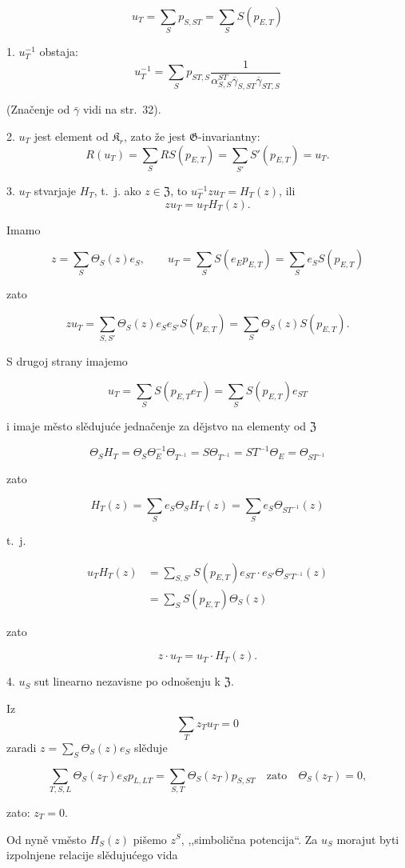 \documentclass[11pt]{article}
\begin{document}
\[
u_T=\sum_S p_{S,ST}=\sum_S S(p_{E,T})
\]



1. \(u_T^{-1}\) obstaja:
\[
u_T^{-1}=\sum_S p_{ST,S}
\frac{1}{\alpha_{S,S}^{ST}\overline{\gamma}_{S,ST}\overline{\gamma}_{ST,S}}
\]

(Značenje od \(\bar{\gamma}\) vidi na str.~32).

2. \(u_T\) jest element od \(\mathfrak K_r\), zato že jest \(\mathfrak G\)-invariantny:
\[
R(u_T)=\sum_S RS(p_{E,T})=\sum_{S'} S'(p_{E,T})=u_T.
\]

3. \(u_T\) stvarjaje \(H_T\), t.~j. ako \(z\in\mathfrak Z\), to \(u_T^{-1}zu_T=H_T(z)\), ili
\[
z u_T=u_T H_T(z).
\]

Imamo

\[
z=\sum_S\Theta_S(z)e_S,\qquad
u_T=\sum_S S(e_Ep_{E,T})=\sum_S e_S S(p_{E,T})
\]

zato

\[
zu_T=\sum_{S,S'}\Theta_S(z)e_Se_{S'}S(p_{E,T})
=\sum_S\Theta_S(z)S(p_{E,T}).
\]

S drugoj strany imajemo

\[
u_T=\sum_S S(p_{E,T}e_T)=\sum_S S(p_{E,T})e_{ST}
\]

i imaje město slědujuće jednačenje za dějstvo na elementy od \(\mathfrak Z\)

\[
\Theta_S H_T=\Theta_S\Theta_E^{-1}\Theta_{T^{-1}}
=S\Theta_{T^{-1}}=ST^{-1}\Theta_E=\Theta_{ST^{-1}}
\]

zato

\[
H_T(z)=\sum_S e_S\Theta_S H_T(z)=\sum_S e_S\Theta_{ST^{-1}}(z)
\]

t.~j.

\[
\begin{aligned}
u_TH_T(z)
&=\sum_{S,S'} S(p_{E,T})e_{ST}\cdot e_{S'}\Theta_{S'T^{-1}}(z)\\
&=\sum_S S(p_{E,T})\Theta_S(z)
\end{aligned}
\]

zato

\[
z\cdot u_T=u_T\cdot H_T(z).
\]

4. \(u_S\) sut linearno nezavisne po odnošenju k \(\mathfrak Z\).

Iz
\[
\sum_T z_Tu_T=0
\]
zaradi \(z=\sum_S\Theta_S(z)e_S\) slěduje

\[
\sum_{T,S,L}\Theta_S(z_T)e_Sp_{L,LT}
=\sum_{S,T}\Theta_S(z_T)p_{S,ST}\quad\text{zato}\quad
\Theta_S(z_T)=0,
\]

zato: \(z_T=0\).

Od nyně vměsto \(H_S(z)\) pišemo \(z^S\), ,,simbolična potencija``. Za \(u_S\) morajut byti izpolnjene relacije slědujućego vida
\end{document}
